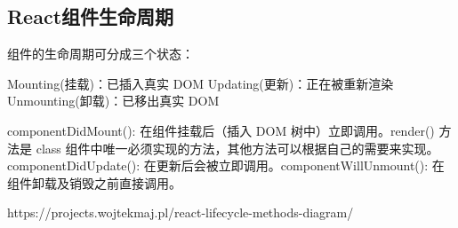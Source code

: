 \documentclass[../../../interview-questions.tex]{subfiles}
\begin{document}
\subsection{React组件生命周期}


组件的生命周期可分成三个状态：

Mounting(挂载)：已插入真实 DOM
Updating(更新)：正在被重新渲染
Unmounting(卸载)：已移出真实 DOM

componentDidMount(): 在组件挂载后（插入 DOM 树中）立即调用。render() 方法是 class 组件中唯一必须实现的方法，其他方法可以根据自己的需要来实现。componentDidUpdate(): 在更新后会被立即调用。componentWillUnmount(): 在组件卸载及销毁之前直接调用。

https://projects.wojtekmaj.pl/react-lifecycle-methods-diagram/
\end{document}
